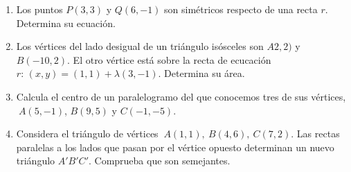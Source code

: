 \vspace{5mm}
\begin{enumerate}


\item	Los puntos $P(3,3)$ y $Q(6,-1)$ son simétricos respecto de una recta $r$. Determina su ecuación.

\vspace{-6mm}
\begin{flushright}
\begin{footnotesize} \textcolor{gris}{}	\end{footnotesize}
\end{flushright}


\item	Los vértices del lado desigual de un triángulo isósceles son $A2,2)$ y $B(-10,2)$. El otro vértice está sobre la recta de ecucación $r:\, (x,y)=(1,1)+\lambda(3,-1)$. Determina su área. 

\vspace{-6mm}
\begin{flushright}
\begin{footnotesize} \textcolor{gris}{}	\end{footnotesize}
\end{flushright}


\item	Calcula el centro de un paralelogramo del que conocemos tres de sus vértices, $\ A(5,-1)$, $B(9,5)$ y $C(-1,-5)$.

\vspace{-6mm}
\begin{flushright}
\begin{footnotesize} \textcolor{gris}{}	\end{footnotesize}
\end{flushright}


\item	Considera el triángulo de vértices $\ A(1,1),\ B(4,6),\ C(7,2)$. Las rectas paralelas a los lados que pasan por el vértice opuesto determinan un nuevo triángulo $A'B'C'$. Comprueba que son semejantes.


\end{enumerate}
